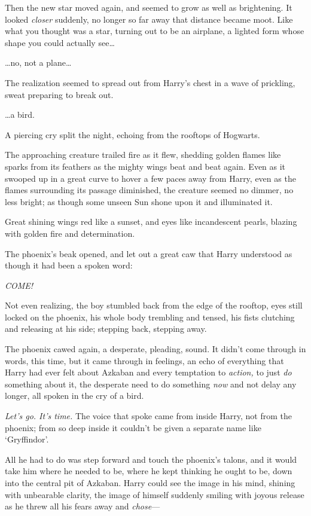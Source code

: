Then the new star moved again, and seemed to grow as well as brightening. It
looked \emph{closer} suddenly, no longer so far away that distance became moot.
Like what you thought was a star, turning out to be an airplane, a lighted form
whose shape you could actually see{\ldots}

{\ldots}no, not a plane{\ldots}

The realization seemed to spread out from Harry's chest in a wave of prickling,
sweat preparing to break out.

{\ldots}a bird.

A piercing cry split the night, echoing from the rooftops of Hogwarts.

The approaching creature trailed fire as it flew, shedding golden flames like
sparks from its feathers as the mighty wings beat and beat again. Even as it
swooped up in a great curve to hover a few paces away from Harry, even as the
flames surrounding its passage diminished, the creature seemed no dimmer, no
less bright; as though some unseen Sun shone upon it and illuminated it.

Great shining wings red like a sunset, and eyes like incandescent pearls,
blazing with golden fire and determination.

The phoenix's beak opened, and let out a great caw that Harry understood as
though it had been a spoken word:

\emph{COME!}

Not even realizing, the boy stumbled back from the edge of the rooftop, eyes
still locked on the phoenix, his whole body trembling and tensed, his fists
clutching and releasing at his side; stepping back, stepping away.

The phoenix cawed again, a desperate, pleading, sound. It didn't come through
in words, this time, but it came through in feelings, an echo of everything
that Harry had ever felt about Azkaban and every temptation to \emph{action,}
to just \emph{do} something about it, the desperate need to do something
\emph{now} and not delay any longer, all spoken in the cry of a bird.

\emph{Let's go. It's time.} The voice that spoke came from inside Harry, not
from the phoenix; from so deep inside it couldn't be given a separate name like
`Gryffindor'.

All he had to do was step forward and touch the phoenix's talons, and it would
take him where he needed to be, where he kept thinking he ought to be, down
into the central pit of Azkaban. Harry could see the image in his mind, shining
with unbearable clarity, the image of himself suddenly smiling with joyous
release as he threw all his fears away and \emph{chose}---

